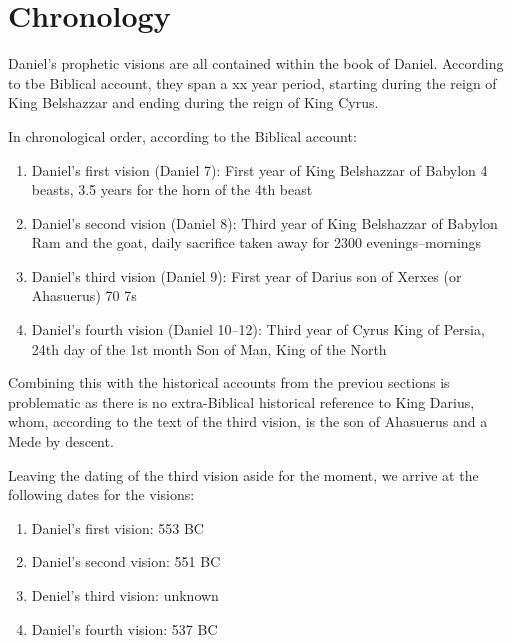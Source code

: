 \section{Chronology}
Daniel's prophetic visions are all contained within the book of Daniel.  According to tbe Biblical account, they span a xx year period, starting during the reign of King Belshazzar
and ending during the reign of King Cyrus.

In chronological order, according to the Biblical account:
\begin{enumerate}
    \item Daniel's first vision (Daniel 7): First year of King Belshazzar of Babylon  4 beasts, 3.5 years for the horn of the 4th beast
    \item Daniel's second vision (Daniel 8): Third year of King Belshazzar of Babylon Ram and the goat, daily sacrifice taken away for 2300 evenings--mornings
    \item Daniel's third vision (Daniel 9): First year of Darius son of Xerxes (or Ahasuerus)  70 7s
    \item Daniel's fourth vision (Daniel 10--12): Third year of Cyrus King of Persia, 24th day of the 1st month  Son of Man, King of the North
\end{enumerate}

Combining this with the historical accounts from the previou sections is problematic as there is no extra-Biblical historical reference to King Darius, whom,
according to the text of the third vision, is the son of Ahasuerus and a Mede by descent.

Leaving the dating of the third vision aside for the moment, we arrive at the following dates for the visions:
\begin{enumerate}
    \item Daniel's first vision: 553 BC
    \item Daniel's second vision: 551 BC
    \item Deniel's third vision: unknown
    \item Daniel's fourth vision: 537 BC
\end{enumerate}

